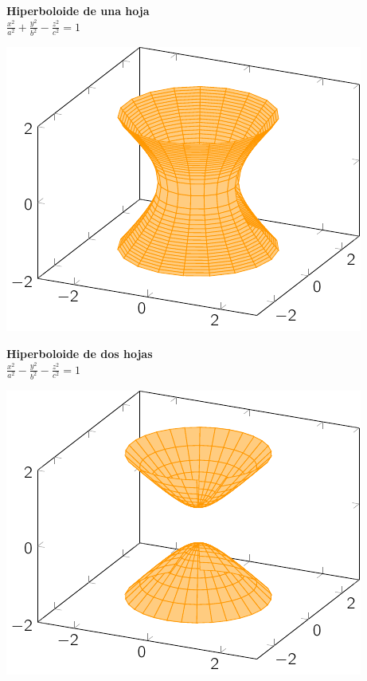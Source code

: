 \begin{minipage}[c]{0.45\textwidth}
  {\bf Hiperboloide de una hoja}\vspace{1em}\\
  $\displaystyle \frac{{x}^2}{a^2} + \frac{{y}^2}{b^2}-\frac{{z}^2}{c^2} = 1$
\end{minipage}\hfill
\begin{minipage}[]{0.45\textwidth}
\includegraphics{./img/hip1.pdf}
\end{minipage}

\begin{minipage}[c]{0.45\textwidth}
  {\bf Hiperboloide de dos hojas}\vspace{1em}\\
  $\displaystyle \frac{{x}^2}{a^2} - \frac{{y}^2}{b^2}-\frac{{z}^2}{c^2} = 1$
\end{minipage}\hfill
\begin{minipage}[]{0.45\textwidth}
\includegraphics{./img/hip2.pdf}
\end{minipage}

